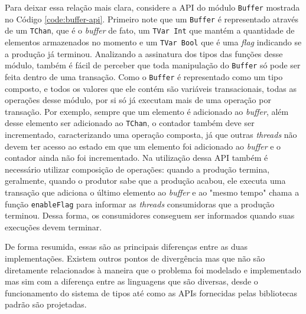 Para deixar essa relação mais clara, considere a API do módulo \verb|Buffer| mostrada no Código \ref{code:buffer-api}. Primeiro note que um \verb|Buffer| é representado através de um \verb|TChan|, que é o \emph{buffer} de fato, um \verb|TVar Int| que mantém a quantidade de elementos armazenados no momento e um \verb|TVar Bool| que é uma \emph{flag} indicando se a produção já terminou. Analizando a assinatura dos tipos das funções desse módulo, também é fácil de perceber que toda manipulação do \verb|Buffer| só pode ser feita dentro de uma transação. Como o \verb|Buffer| é representado como um tipo composto, e todos os valores que ele contém são variáveis transacionais, todas as operações desse módulo, por si só já executam mais de uma operação por transação. Por exemplo, sempre que um elemento é adicionado ao \emph{buffer}, além desse elemento ser adicionado ao \verb|TChan|, o contador também deve ser incrementado, caracterizando uma operação composta, já que outras \emph{threads} não devem ter acesso ao estado em que um elemento foi adicionado ao \emph{buffer} e o contador ainda não foi incrementado. Na utilização dessa API também é necessário utilizar composição de operações: quando a produção termina, geralmente, quando o produtor sabe que a produção acabou, ele executa uma transação que adiciona o último elemento ao \emph{buffer} e ao "mesmo tempo" chama a função \verb|enableFlag| para informar as \emph{threads} consumidoras que a produção terminou. Dessa forma, os consumidores conseguem ser informados quando suas execuções devem terminar.

De forma resumida, essas são as principais diferenças entre as duas implementações. Existem outros pontos de divergência mas que não são diretamente relacionados à maneira que o problema foi modelado e implementado mas sim com a diferença entre as linguagens que são diversas, desde o funcionamento do sistema de tipos até como as APIs fornecidas pelas bibliotecas padrão são projetadas.

